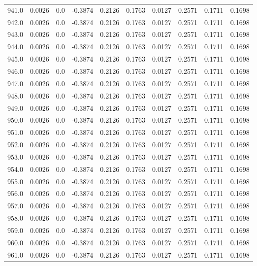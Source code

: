 \begin{longtable}{lrrrrrrrrr}
941.0 & 0.0026 & 0.0 & -0.3874 & 0.2126 & 0.1763 & 0.0127 & 0.2571 & 0.1711 & 0.1698 \\
942.0 & 0.0026 & 0.0 & -0.3874 & 0.2126 & 0.1763 & 0.0127 & 0.2571 & 0.1711 & 0.1698 \\
943.0 & 0.0026 & 0.0 & -0.3874 & 0.2126 & 0.1763 & 0.0127 & 0.2571 & 0.1711 & 0.1698 \\
944.0 & 0.0026 & 0.0 & -0.3874 & 0.2126 & 0.1763 & 0.0127 & 0.2571 & 0.1711 & 0.1698 \\
945.0 & 0.0026 & 0.0 & -0.3874 & 0.2126 & 0.1763 & 0.0127 & 0.2571 & 0.1711 & 0.1698 \\
946.0 & 0.0026 & 0.0 & -0.3874 & 0.2126 & 0.1763 & 0.0127 & 0.2571 & 0.1711 & 0.1698 \\
947.0 & 0.0026 & 0.0 & -0.3874 & 0.2126 & 0.1763 & 0.0127 & 0.2571 & 0.1711 & 0.1698 \\
948.0 & 0.0026 & 0.0 & -0.3874 & 0.2126 & 0.1763 & 0.0127 & 0.2571 & 0.1711 & 0.1698 \\
949.0 & 0.0026 & 0.0 & -0.3874 & 0.2126 & 0.1763 & 0.0127 & 0.2571 & 0.1711 & 0.1698 \\
950.0 & 0.0026 & 0.0 & -0.3874 & 0.2126 & 0.1763 & 0.0127 & 0.2571 & 0.1711 & 0.1698 \\
951.0 & 0.0026 & 0.0 & -0.3874 & 0.2126 & 0.1763 & 0.0127 & 0.2571 & 0.1711 & 0.1698 \\
952.0 & 0.0026 & 0.0 & -0.3874 & 0.2126 & 0.1763 & 0.0127 & 0.2571 & 0.1711 & 0.1698 \\
953.0 & 0.0026 & 0.0 & -0.3874 & 0.2126 & 0.1763 & 0.0127 & 0.2571 & 0.1711 & 0.1698 \\
954.0 & 0.0026 & 0.0 & -0.3874 & 0.2126 & 0.1763 & 0.0127 & 0.2571 & 0.1711 & 0.1698 \\
955.0 & 0.0026 & 0.0 & -0.3874 & 0.2126 & 0.1763 & 0.0127 & 0.2571 & 0.1711 & 0.1698 \\
956.0 & 0.0026 & 0.0 & -0.3874 & 0.2126 & 0.1763 & 0.0127 & 0.2571 & 0.1711 & 0.1698 \\
957.0 & 0.0026 & 0.0 & -0.3874 & 0.2126 & 0.1763 & 0.0127 & 0.2571 & 0.1711 & 0.1698 \\
958.0 & 0.0026 & 0.0 & -0.3874 & 0.2126 & 0.1763 & 0.0127 & 0.2571 & 0.1711 & 0.1698 \\
959.0 & 0.0026 & 0.0 & -0.3874 & 0.2126 & 0.1763 & 0.0127 & 0.2571 & 0.1711 & 0.1698 \\
960.0 & 0.0026 & 0.0 & -0.3874 & 0.2126 & 0.1763 & 0.0127 & 0.2571 & 0.1711 & 0.1698 \\
961.0 & 0.0026 & 0.0 & -0.3874 & 0.2126 & 0.1763 & 0.0127 & 0.2571 & 0.1711 & 0.1698 \\

\end{longtable}
